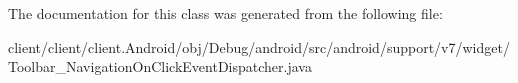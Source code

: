 The documentation for this class was generated from the following file\+:\begin{DoxyCompactItemize}
\item 
client/client/client.\+Android/obj/\+Debug/android/src/android/support/v7/widget/Toolbar\+\_\+\+Navigation\+On\+Click\+Event\+Dispatcher.\+java\end{DoxyCompactItemize}
